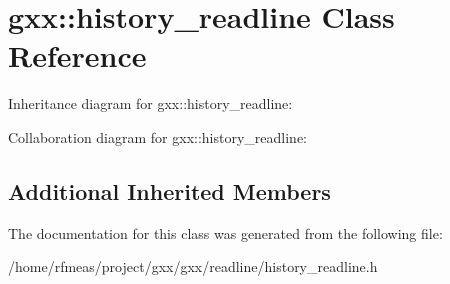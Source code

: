 \hypertarget{classgxx_1_1history__readline}{}\section{gxx\+:\+:history\+\_\+readline Class Reference}
\label{classgxx_1_1history__readline}


Inheritance diagram for gxx\+:\+:history\+\_\+readline\+:


Collaboration diagram for gxx\+:\+:history\+\_\+readline\+:
\subsection*{Additional Inherited Members}


The documentation for this class was generated from the following file\+:\begin{DoxyCompactItemize}
\item 
/home/rfmeas/project/gxx/gxx/readline/history\+\_\+readline.\+h\end{DoxyCompactItemize}
